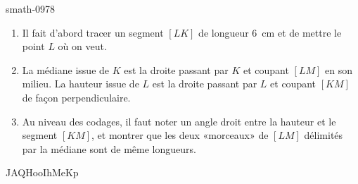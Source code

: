 
\begin{corrige}{smath-0978}

    \begin{enumerate}
        \item
    Il fait d'abord tracer un segment \( [LK]\) de longueur \SI{6}{\centi\meter} et de mettre le point \( L\) où on veut.
\item
    La médiane issue de \( K\) est la droite passant par \( K\) et coupant \( [LM]\) en son milieu. La hauteur issue de \( L\) est la droite passant par \( L\) et coupant \( [KM]\) de façon perpendiculaire.
\item
    Au niveau des codages, il faut noter un angle droit entre la hauteur et le segment \( [KM]\), et montrer que les deux «morceaux» de \( [LM]\) délimités par la médiane sont de même longueurs.
    \end{enumerate}
    
JAQHooIhMeKp

\end{corrige}

